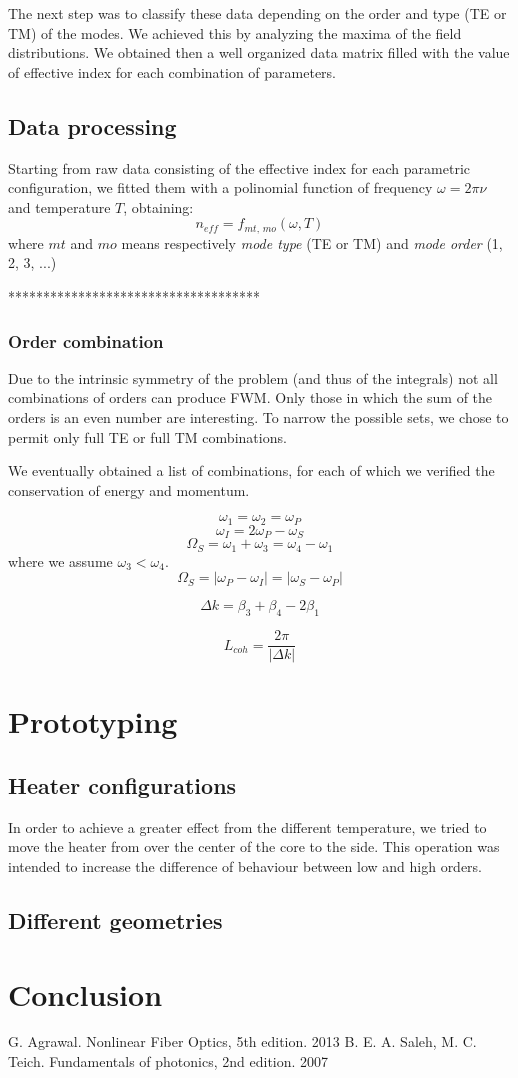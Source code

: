 \documentclass[12pt,a4paper,twoside]{article}
\begin{document}
The next step was to classify these data depending on the order and type (TE or TM) of the modes.
We achieved this by analyzing the maxima of the field distributions.
We obtained then a well organized data matrix filled with the value of effective index for each combination of parameters.

\subsection{Data processing}
Starting from raw data consisting of the effective index for each parametric configuration, we fitted them with a polinomial function of frequency $\omega = 2\pi \nu$ and temperature $T$, obtaining:
$$n_{eff} = f_{mt,\,mo} \left( \omega, T \right)$$
where $mt$ and $mo$ means respectively \textit{mode type} (TE or TM) and \textit{mode order} (1, 2, 3, ...)

\vspace{18pt}
************************************

\subsubsection*{Order combination}

Due to the intrinsic symmetry of the problem (and thus of the integrals) not all combinations of orders can produce FWM.
Only those in which the sum of the orders is an even number are interesting.
To narrow the possible sets, we chose to permit only full TE or full TM  combinations.

We eventually obtained a list of combinations, for each of which we verified the conservation of energy and momentum.


$$\omega_1 = \omega_2 = \omega_P$$
$$\omega_I = 2\omega_P - \omega_S$$
$$\Omega_S = \omega_1 + \omega_3 = \omega_4 - \omega_1$$
where we assume $\omega_3 < \omega_4$.
$$\Omega_S = |\omega_P - \omega_I| = |\omega_S - \omega_P|$$

$$\Delta k = \beta_3 + \beta_4 - 2\beta_1$$

$$L_{coh} = \frac{2\pi}{|\Delta k|}$$



\section{Prototyping}

\subsection{Heater configurations}
In order to achieve a greater effect from the different temperature, we tried to move the heater from over the center of the core to the side.
This operation was intended to increase the difference of behaviour between low and high orders.
\subsection{Different geometries}

\section{Conclusion}

\cleardoublepage
\begin{thebibliography}{9}
 G. Agrawal. Nonlinear Fiber Optics, 5th edition. 2013
 B. E. A. Saleh, M. C. Teich. Fundamentals of photonics, 2nd edition. 2007
\end{thebibliography}
\end{document}
